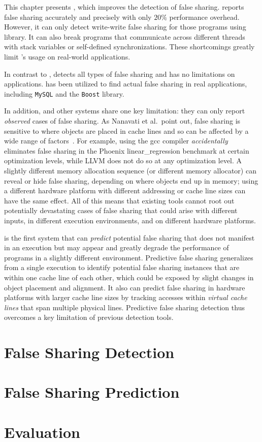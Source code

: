 This chapter presents \Predator{}, which improves the detection of false sharing. \SheriffDetect{} reports false sharing accurately and precisely with only $20\%$ performance overhead. However, it can only detect write-write false sharing for those programs using \pthreads{} library. It can also break programs that communicate across different threads with stack variables or self-defined synchronizations. These shortcomings greatly limit \Sheriff{}'s usage on real-world applications.  

In contrast to \SheriffDetect{}, \Predator{} detects all types of false sharing and has no limitations on applications. \Predator{} has been utilized to find actual false sharing in real applications, including \texttt{MySQL} and the \texttt{Boost} library.

In addition, \SheriffDetect{} and other systems share one key limitation: they can only report \emph{observed} cases of false sharing. As Nanavati et al.\ point out, false sharing is sensitive to where objects are placed in cache lines and so can be affected by a wide range of factors~\cite{OSdetection}. For example, using the gcc compiler \emph{accidentally} eliminates false sharing in the Phoenix linear\_regression benchmark at certain optimization levels, while LLVM does not do so at any optimization level.  A slightly different memory allocation sequence (or different memory allocator) can reveal or hide
false sharing, depending on where objects end up in memory; using a different hardware platform with different addressing or cache line sizes can have the same effect. All of this means that existing tools cannot root out potentially devastating cases of false sharing that could arise with different inputs, in different execution environments, and on different hardware platforms.

\Predator{} is the first system that can \emph{predict} potential false sharing that does not manifest in an execution but may appear and greatly degrade the performance of programs in a slightly different
environment. Predictive false sharing generalizes from a single execution to identify potential false sharing instances that are within one cache line of each other, which could be exposed by slight changes in object placement and alignment. It also can predict false sharing in hardware platforms with larger cache line sizes by tracking accesses within \emph{virtual cache lines} that span multiple physical lines. Predictive false sharing detection thus overcomes a key limitation of previous detection tools.

\section{False Sharing Detection}


\section{False Sharing Prediction}


\section{Evaluation}



